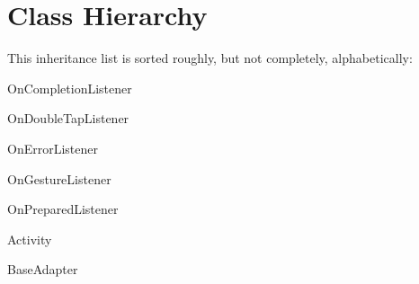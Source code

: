 \section{Class Hierarchy}
This inheritance list is sorted roughly, but not completely, alphabetically\+:\begin{DoxyCompactList}
\item On\+Completion\+Listener\begin{DoxyCompactList}
\item {}
\end{DoxyCompactList}
\item On\+Double\+Tap\+Listener\begin{DoxyCompactList}
\item {}
\end{DoxyCompactList}
\item On\+Error\+Listener\begin{DoxyCompactList}
\item {}
\end{DoxyCompactList}
\item On\+Gesture\+Listener\begin{DoxyCompactList}
\item {}
\end{DoxyCompactList}
\item On\+Prepared\+Listener\begin{DoxyCompactList}
\item {}
\end{DoxyCompactList}
\item {}
\item Activity\begin{DoxyCompactList}
\item {}
\end{DoxyCompactList}
\item Base\+Adapter\begin{DoxyCompactList}

\end{DoxyCompactList}
\end{DoxyCompactList}
